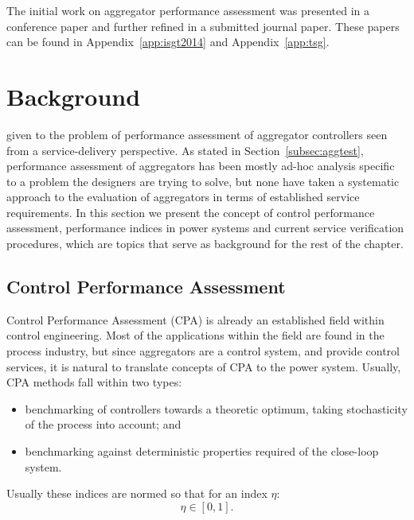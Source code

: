 The initial work on aggregator performance assessment was presented in a conference paper and further refined in a submitted journal paper. These papers can be found in Appendix~\ref{app:isgt2014} and Appendix~\ref{app:tsg}. 


\section{Background}
 given to the problem of performance assessment of aggregator controllers seen from a service-delivery perspective. As stated in Section~\ref{subsec:aggtest}, performance assessment of aggregators has been mostly ad-hoc analysis specific to a problem the designers are trying to solve, but none have taken a systematic approach to the evaluation of aggregators in terms of established service requirements. In this section we present the concept of control performance assessment, performance indices in power systems and current service verification procedures, which are topics that serve as background for the rest of the chapter.

\subsection{Control Performance Assessment}
Control Performance Assessment (CPA) is already an established field within control engineering. Most of the applications within the field are found in the process industry, but since aggregators are a control system, and provide control services, it is natural to translate concepts of CPA to the power system. Usually, CPA methods fall within two types:
\begin{itemize}
	\item benchmarking of controllers towards a theoretic optimum, taking stochasticity of the process into account; and
	\item benchmarking against deterministic properties required of the close-loop system.
\end{itemize}

Usually these indices are normed so that for an index $\eta$:
\begin{equation}
	\eta \in [0,1].
\end{equation}

